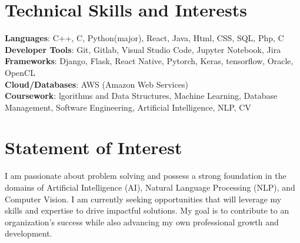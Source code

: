 \documentclass[a4paper,11pt]{article}
\makeatletter
\newcommand{\resumePOR}[3]{
\vspace{0.5mm}\item
    \begin{tabular*}{0.97\textwidth}[t]{l@{\extracolsep{\fill}}r}
        \textbf{#1}\hspace{0.3mm}#2 & \textit{\small{#3}} 
    \end{tabular*}
    \vspace{-2mm}
}
\newcommand{\resumeSubheading}[4]{
\vspace{0.5mm}\item
    \begin{tabular*}{0.98\textwidth}[t]{l@{\extracolsep{\fill}}r}
        \textbf{#1} & \textit{\footnotesize{#4}} \\
        \textit{\footnotesize{#3}} &  \footnotesize{#2}\\
    \end{tabular*}
    \vspace{-2.4mm}
}
\newcommand{\resumeSubHeadingListStart}{\begin{itemize}[leftmargin=*,labelsep=0mm]}
\newcommand{\resumeItemListStart}{\begin{justify}\begin{itemize}[leftmargin=3ex, rightmargin=2ex, noitemsep,labelsep=1.2mm,itemsep=0mm]\small}
\newcommand{\resumeSubHeadingListEnd}{\end{itemize}\vspace{2mm}}
\newcommand{\resumeItemListEnd}{\end{itemize}\end{justify}\vspace{-2mm}}
\makeatother
\begin{document}



\section{\textbf{Technical Skills and Interests}}
 \begin{itemize}[leftmargin=0.05in, label={}]
    \small{\item{
     \textbf{Languages}{: C++, C, Python(major), React, Java, Html, CSS, SQL, Php, C} \\
     \textbf{Developer Tools}{: Git, Gitlab, Visual Studio Code, Jupyter Notebook, Jira} \\
     \textbf{Frameworks}{: Django, Flask, React Native, Pytorch, Keras, tensorflow, Oracle, OpenCL} \\
     \textbf{Cloud/Databases}{: AWS (Amazon Web Services)} \\
     \textbf{Coursework}{: lgorithms and Data Structures, Machine Learning, Database Management, Software Engineering,
Artificial Intelligence, NLP, CV} \\
    }}
 \end{itemize}
 \vspace{-16pt}



\section{\textbf{Statement of Interest}}
\vspace{-0.4mm}
\resumeSubHeadingListStart
{I am passionate about problem solving and possess a strong foundation in the domains of Artificial Intelligence (AI), Natural Language Processing (NLP), and Computer Vision. I am currently seeking opportunities that will leverage my skills and expertise to drive impactful solutions. My goal is to contribute to an organization's success while also advancing my own professional growth and development.}

\resumeSubHeadingListEnd
\vspace{-5mm}






\end{document}
